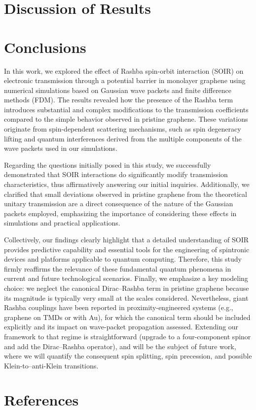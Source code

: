 \documentclass{../assets/templates/iopjournal}
\begin{document}
    \section{Discussion of Results}\label{sec:discussion-of-results}
    


    \section{Conclusions}\label{sec:conclusions}

    In this work, we explored the effect of Rashba spin-orbit interaction (SOIR) on electronic transmission through a potential barrier in monolayer graphene using numerical simulations based on Gaussian wave packets and finite difference methods (FDM). The results revealed how the presence of the Rashba term introduces substantial and complex modifications to the transmission coefficients compared to the simple behavior observed in pristine graphene.
    These variations originate from spin-dependent scattering mechanisms, such as spin degeneracy lifting and quantum interferences derived from the multiple components of the wave packets used in our simulations.

    Regarding the questions initially posed in this study, we successfully demonstrated that SOIR interactions do significantly modify transmission characteristics, thus affirmatively answering our initial inquiries.
    Additionally, we clarified that small deviations observed in pristine graphene from the theoretical unitary transmission are a direct consequence of the nature of the Gaussian packets employed, emphasizing the importance of considering these effects in simulations and practical applications.

    Collectively, our findings clearly highlight that a detailed understanding of SOIR provides predictive capability and essential tools for the engineering of spintronic devices and platforms applicable to quantum computing.
    Therefore, this study firmly reaffirms the relevance of these fundamental quantum phenomena in current and future technological scenarios.
    Finally, we emphasize a key modeling choice: we neglect the canonical Dirac–Rashba term in pristine graphene because its magnitude is typically very small at the scales considered.
    Nevertheless, giant Rashba couplings have been reported in proximity-engineered systems (e.g., graphene on TMDs or with Au), for which the canonical term should be included explicitly and its impact on wave-packet propagation assessed.
    Extending our framework to that regime is straightforward (upgrade to a four-component spinor and add the Dirac–Rashba operator), and will be the subject of future work, where we will quantify the consequent spin splitting, spin precession, and possible Klein-to–anti-Klein transitions\cite{AvsarNatCommun2014, WangPhysRevX2016, DellAnnaJPhysCondMatt2018}.

    \pagebreak


\section*{References}


\end{document}
